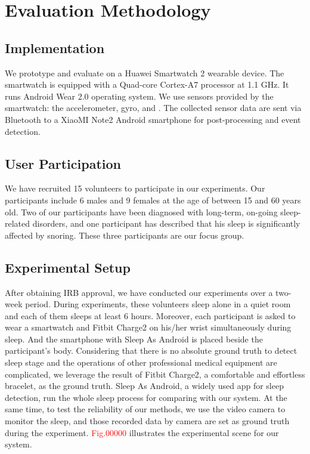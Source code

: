 \section{Evaluation Methodology}
\subsection{Implementation}
We prototype and evaluate \systemname on a Huawei Smartwatch 2 wearable device. The smartwatch is equipped with a Quad-core Cortex-A7
processor at 1.1 GHz.  It runs Android Wear 2.0 operating system. We use  sensors provided by the smartwatch: the
accelerometer, gyro, and . The collected sensor data are sent via Bluetooth to a XiaoMI Note2 Android smartphone for
post-processing and event detection.


\subsection{User Participation} We have recruited 15 volunteers to participate in our experiments. Our
participants include 6 males and 9 females at the age of between 15 and 60 years old. Two of our participants have been diagnosed with
long-term, on-going sleep-related disorders, and one participant has described that his sleep is significantly affected by snoring. These
three participants are our focus group.

\subsection{Experimental Setup}
After obtaining IRB approval, we have conducted our experiments over a two-week period. During experiments, these volunteers sleep alone in
a quiet room and each of them sleeps at least 6 hours. Moreover, each participant is asked to wear a smartwatch and Fitbit Charge2
\cite{fitbit} on his/her wrist simultaneously during sleep. And the smartphone with Sleep As Android \cite{SleepAndroid} is placed beside
the participant's body. Considering that there is no absolute ground truth to detect sleep stage and the operations of other professional
medical equipment are complicated, we leverage the result of Fitbit Charge2, a comfortable and effortless bracelet, as the ground truth.
Sleep As Android, a widely used app for sleep detection, run the whole sleep process for comparing with our system. At the same time, to
test the reliability of our methods, we use the video camera to monitor the sleep, and those recorded data by camera are set as ground
truth during the experiment. \textcolor{red}{Fig.00000} illustrates the experimental scene for our system.

